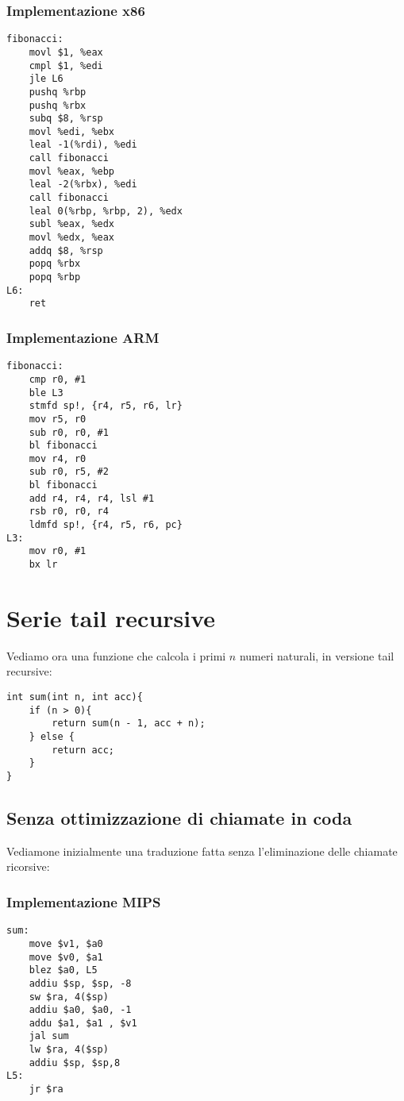 \documentclass[class=book, crop=false, oneside]{standalone}
\begin{document}
\subsubsection{Implementazione x86}

\begin{verbatim}
fibonacci:
	movl $1, %eax
	cmpl $1, %edi
	jle L6
	pushq %rbp
	pushq %rbx
	subq $8, %rsp
	movl %edi, %ebx
	leal -1(%rdi), %edi
	call fibonacci
	movl %eax, %ebp
	leal -2(%rbx), %edi
	call fibonacci
	leal 0(%rbp, %rbp, 2), %edx
	subl %eax, %edx
	movl %edx, %eax
	addq $8, %rsp
	popq %rbx
	popq %rbp
L6:
	ret
\end{verbatim}

\subsubsection{Implementazione ARM}

\begin{verbatim}
fibonacci:
	cmp r0, #1
	ble L3
	stmfd sp!, {r4, r5, r6, lr}
	mov r5, r0
	sub r0, r0, #1
	bl fibonacci
	mov r4, r0
	sub r0, r5, #2
	bl fibonacci
	add r4, r4, r4, lsl #1
	rsb r0, r0, r4
	ldmfd sp!, {r4, r5, r6, pc}
L3:
	mov r0, #1
	bx lr
\end{verbatim}

\section{Serie tail recursive}
Vediamo ora una funzione che calcola i primi \(n\) numeri naturali, in versione tail recursive:
\begin{verbatim}
int sum(int n, int acc){
	if (n > 0){
		return sum(n - 1, acc + n);
	} else {
		return acc;
	}
}
\end{verbatim}

\subsection*{Senza ottimizzazione di chiamate in coda}
Vediamone inizialmente una traduzione fatta senza l'eliminazione delle chiamate ricorsive:
\subsubsection{Implementazione MIPS}

\begin{verbatim}
sum:
	move $v1, $a0
	move $v0, $a1
	blez $a0, L5
	addiu $sp, $sp, -8
	sw $ra, 4($sp)
	addiu $a0, $a0, -1
	addu $a1, $a1 , $v1
	jal sum
	lw $ra, 4($sp)
	addiu $sp, $sp,8
L5:
	jr $ra
\end{verbatim}
\end{document}

